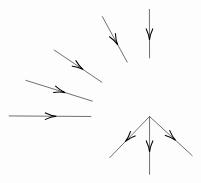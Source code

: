 \documentclass{article}
\begin{document}
\begin{example}
\[\begin{tikzpicture}[x=0.75pt,y=0.75pt,yscale=-1,xscale=1]
\draw    (171.47,100.87) -- (133.33,140.33) ;
\draw [shift={(148.23,124.91)}, rotate = 314.02] [color={rgb, 255:red, 0; green, 0; blue, 0 }  ][line width=0.75]    (10.93,-3.29) .. controls (6.95,-1.4) and (3.31,-0.3) .. (0,0) .. controls (3.31,0.3) and (6.95,1.4) .. (10.93,3.29)   ;
\draw    (171.47,100.87) -- (171.47,156.33) ;
\draw [shift={(171.47,134.6)}, rotate = 270] [color={rgb, 255:red, 0; green, 0; blue, 0 }  ][line width=0.75]    (10.93,-3.29) .. controls (6.95,-1.4) and (3.31,-0.3) .. (0,0) .. controls (3.31,0.3) and (6.95,1.4) .. (10.93,3.29)   ;
\draw    (171.47,100.87) -- (212.33,138.33) ;
\draw [shift={(196.32,123.65)}, rotate = 222.51] [color={rgb, 255:red, 0; green, 0; blue, 0 }  ][line width=0.75]    (10.93,-3.29) .. controls (6.95,-1.4) and (3.31,-0.3) .. (0,0) .. controls (3.31,0.3) and (6.95,1.4) .. (10.93,3.29)   ;
\draw    (80.33,37.33) -- (126.33,68.4) ;
\draw [shift={(108.31,56.22)}, rotate = 214.03] [color={rgb, 255:red, 0; green, 0; blue, 0 }  ][line width=0.75]    (10.93,-3.29) .. controls (6.95,-1.4) and (3.31,-0.3) .. (0,0) .. controls (3.31,0.3) and (6.95,1.4) .. (10.93,3.29)   ;
\draw    (37.33,100.33) -- (116,100.87) ;
\draw [shift={(82.67,100.64)}, rotate = 180.39] [color={rgb, 255:red, 0; green, 0; blue, 0 }  ][line width=0.75]    (10.93,-3.29) .. controls (6.95,-1.4) and (3.31,-0.3) .. (0,0) .. controls (3.31,0.3) and (6.95,1.4) .. (10.93,3.29)   ;
\draw    (53.33,66.33) -- (117.33,86.33) ;
\draw [shift={(91.06,78.12)}, rotate = 197.35] [color={rgb, 255:red, 0; green, 0; blue, 0 }  ][line width=0.75]    (10.93,-3.29) .. controls (6.95,-1.4) and (3.31,-0.3) .. (0,0) .. controls (3.31,0.3) and (6.95,1.4) .. (10.93,3.29)   ;
\draw    (126.33,5.33) -- (150.33,49.33) ;
\draw [shift={(141.21,32.6)}, rotate = 241.39] [color={rgb, 255:red, 0; green, 0; blue, 0 }  ][line width=0.75]    (10.93,-3.29) .. controls (6.95,-1.4) and (3.31,-0.3) .. (0,0) .. controls (3.31,0.3) and (6.95,1.4) .. (10.93,3.29)   ;
\draw    (171.33,-1.67) -- (171.47,45.4) ;
\draw [shift={(171.42,27.87)}, rotate = 269.84] [color={rgb, 255:red, 0; green, 0; blue, 0 }  ][line width=0.75]    (10.93,-3.29) .. controls (6.95,-1.4) and (3.31,-0.3) .. (0,0) .. controls (3.31,0.3) and (6.95,1.4) .. (10.93,3.29)   ;

\end{tikzpicture}\]
\end{example}
\end{document}
